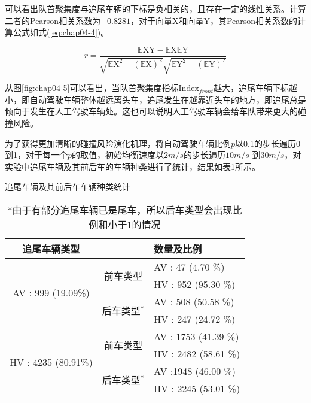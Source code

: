 可以看出队首聚集度与追尾车辆的下标是负相关的，且存在一定的线性关系。计算二者的Pearson相关系数为$-0.8281$，对于向量$\mathrm{X}$和向量$\mathrm{Y}$，其Pearson相关系数的计算公式如式(\ref{eq:chap04-4})。

\begin{equation}
    r = \frac{\mathbb{E}\mathrm{XY}-\mathbb{E}\mathrm{X}\mathbb{E}\mathrm{Y}}{\sqrt{\mathbb{E}\mathrm{X^2}-(\mathbb{E}\mathrm{X})^2}\sqrt{\mathbb{E}\mathrm{Y^2}-(\mathbb{E}\mathrm{Y})^2}}
    \label{eq:chap04-4}
\end{equation}

从图\ref{fig:chap04-5}可以看出，当队首聚集度指标$\mathrm{Index}_{front}$越大，追尾车辆下标越小，即自动驾驶车辆整体越远离头车，追尾发生在越靠近头车的地方，即追尾总是倾向于发生在人工驾驶车辆处。这也可以说明人工驾驶车辆会给车队带来更大的碰撞风险。

为了获得更加清晰的碰撞风险演化机理，将自动驾驶车辆比例$p$以0.1的步长遍历0到1，对于每一个$p$的取值，初始均衡速度以$2m/s$的步长遍历$10m/s$
到$30m/s$，对实验中追尾车辆及其前后车的车辆种类进行了统计，结果如表\ref{tab:chap04-2}所示。

\begin{table}
    \centering
    \caption{追尾车辆及其前后车车辆种类统计}
    \begin{tabular}{ccl}
      \toprule
      追尾车辆类型                 &                                &  数量及比例  \\
      \midrule
      \multirow{4}{*}{AV : 999 (19.09\%)}         &    \multirow{2}{*}{前车类型}    &   AV : 47 (4.70 \%)    \\
                                 &                                       &   HV : 952 (95.30 \%)   \\
      \cline{2-3}
                                 &    \multirow{2}{*}{后车类型$^*$}    &   AV : 508 (50.58 \%)    \\
                                 &                                &   HV : 247 (24.72 \%)   \\       
      \hline
      \multirow{4}{*}{HV : 4235 (80.91\%)}        &    \multirow{2}{*}{前车类型}    &   AV : 1753 (41.39 \%)    \\
                                 &                                &   HV : 2482 (58.61 \%)  \\      
      \cline{2-3}
                                 &    \multirow{2}{*}{后车类型$^*$}    &   AV :1948 (46.00 \%)  \\
                                 &                                &   HV : 2245 (53.01 \%)  \\     
      \bottomrule
    \end{tabular}
    \caption*{*由于有部分追尾车辆已是尾车，所以后车类型会出现比例和小于1的情况}
    \label{tab:chap04-2}
  \end{table}

